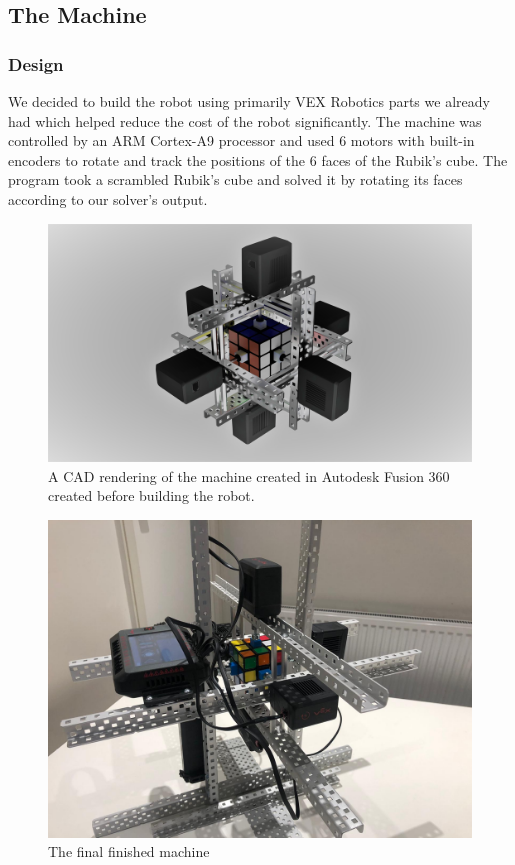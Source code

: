 \documentclass[8pt]{article}
\begin{document}
\subsection{The Machine}

\subsubsection{Design}

We decided to build the robot using primarily VEX Robotics parts we already had which helped
reduce the cost of the robot significantly. The machine was controlled by an ARM Cortex-A9 processor and
used 6 motors with built-in encoders to rotate and track the positions of the 6 faces of the 
Rubik's cube. The program took a scrambled Rubik's cube and solved it by rotating its faces according to our solver's output. 

\begin{minipage}{0.45\textwidth}
\begin{figure}[H]
\centering
\includegraphics[scale=0.05]{main cad.jpg}
\caption{A CAD rendering of the machine created in Autodesk Fusion 360 created
before building the robot.}
\end{figure}
\end{minipage}%
\hfill
\begin{minipage}{0.45\textwidth}
\begin{figure}[H]
\centering
\includegraphics[scale=0.11]{final machine.jpg}
\caption{The final finished machine}
\end{figure}
\end{minipage}
\end{document}
